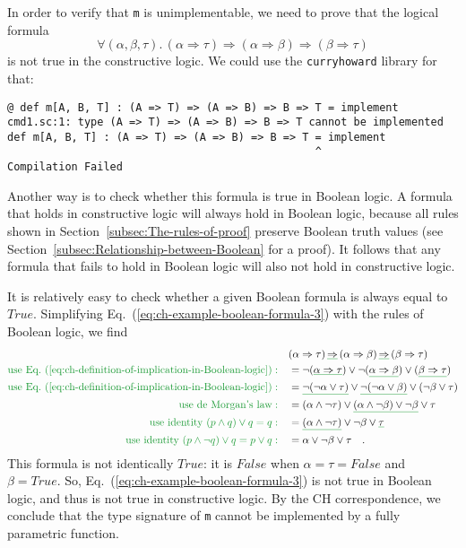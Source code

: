 In order to verify that \lstinline!m! is unimplementable, we need
to prove that the logical formula
\begin{equation}
\forall(\alpha,\beta,\tau).\,(\alpha\Rightarrow\tau)\Rightarrow(\alpha\Rightarrow\beta)\Rightarrow(\beta\Rightarrow\tau)\label{eq:ch-example-boolean-formula-3}
\end{equation}
is not true in the constructive logic. We could use the \texttt{curryhoward}
library for that:
\begin{lstlisting}
@ def m[A, B, T] : (A => T) => (A => B) => B => T = implement
cmd1.sc:1: type (A => T) => (A => B) => B => T cannot be implemented
def m[A, B, T] : (A => T) => (A => B) => B => T = implement
                                                ^
Compilation Failed
\end{lstlisting}
Another way is to check whether this formula is true in Boolean logic.
A formula that holds in constructive logic will always hold in Boolean
logic, because all rules shown in Section~\ref{subsec:The-rules-of-proof}
preserve Boolean truth values (see Section~\ref{subsec:Relationship-between-Boolean}
for a proof). It follows that any formula that fails to hold in Boolean
logic will also not hold in constructive logic. 

It is relatively easy to check whether a given Boolean formula is
always equal to $True$. Simplifying Eq.~(\ref{eq:ch-example-boolean-formula-3})
with the rules of Boolean logic, we find
\begin{align*}
 & (\alpha\Rightarrow\tau)\,\gunderline{\Rightarrow}\,(\alpha\Rightarrow\beta)\,\gunderline{\Rightarrow}\,(\beta\Rightarrow\tau)\\
{\color{greenunder}\text{use Eq.~(\ref{eq:ch-definition-of-implication-in-Boolean-logic})}:}\quad & =\neg(\gunderline{\alpha\Rightarrow\tau})\vee\neg(\gunderline{\alpha\Rightarrow\beta})\vee(\gunderline{\beta\Rightarrow\tau})\\
{\color{greenunder}\text{use Eq.~(\ref{eq:ch-definition-of-implication-in-Boolean-logic})}:}\quad & =\gunderline{\neg(\neg\alpha\vee\tau)}\vee\gunderline{\neg(\neg\alpha\vee\beta)}\vee(\neg\beta\vee\tau)\\
{\color{greenunder}\text{use de Morgan\textsf{'}s law}:}\quad & =\left(\alpha\wedge\neg\tau\right)\vee\gunderline{\left(\alpha\wedge\neg\beta\right)\vee\neg\beta}\vee\tau\\
{\color{greenunder}\text{use identity }(p\wedge q)\vee q=q:}\quad & =\gunderline{\left(\alpha\wedge\neg\tau\right)}\vee\neg\beta\vee\gunderline{\tau}\\
{\color{greenunder}\text{use identity }(p\wedge\neg q)\vee q=p\vee q:}\quad & =\alpha\vee\neg\beta\vee\tau\quad.
\end{align*}
This formula is not identically $True$: it is $False$ when $\alpha=\tau=False$
and $\beta=True$. So, Eq.~(\ref{eq:ch-example-boolean-formula-3})
is not true in Boolean logic, and thus is not true in constructive
logic. By the CH correspondence, we conclude that the type signature
of \lstinline!m! cannot be implemented by a fully parametric function.

